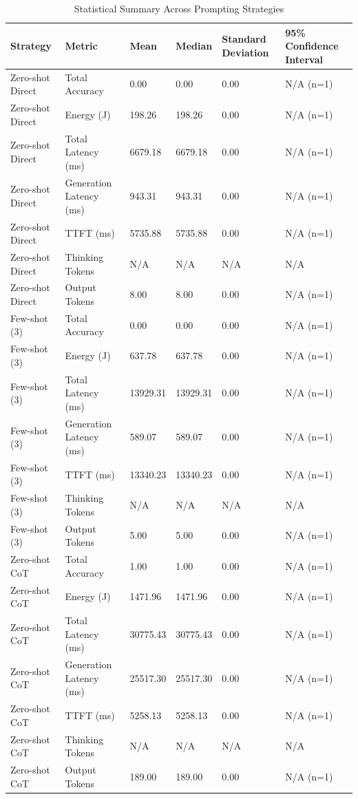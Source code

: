 \begin{table}
\caption{Statistical Summary Across Prompting Strategies}
\label{tab:statistical_summary}
\begin{tabular}{llllll}
\toprule
Strategy & Metric & Mean & Median & Standard Deviation & 95\% Confidence Interval \\
\midrule
Zero-shot Direct & Total Accuracy & 0.00 & 0.00 & 0.00 & N/A (n=1) \\
Zero-shot Direct & Energy (J) & 198.26 & 198.26 & 0.00 & N/A (n=1) \\
Zero-shot Direct & Total Latency (ms) & 6679.18 & 6679.18 & 0.00 & N/A (n=1) \\
Zero-shot Direct & Generation Latency (ms) & 943.31 & 943.31 & 0.00 & N/A (n=1) \\
Zero-shot Direct & TTFT (ms) & 5735.88 & 5735.88 & 0.00 & N/A (n=1) \\
Zero-shot Direct & Thinking Tokens & N/A & N/A & N/A & N/A \\
Zero-shot Direct & Output Tokens & 8.00 & 8.00 & 0.00 & N/A (n=1) \\
Few-shot (3) & Total Accuracy & 0.00 & 0.00 & 0.00 & N/A (n=1) \\
Few-shot (3) & Energy (J) & 637.78 & 637.78 & 0.00 & N/A (n=1) \\
Few-shot (3) & Total Latency (ms) & 13929.31 & 13929.31 & 0.00 & N/A (n=1) \\
Few-shot (3) & Generation Latency (ms) & 589.07 & 589.07 & 0.00 & N/A (n=1) \\
Few-shot (3) & TTFT (ms) & 13340.23 & 13340.23 & 0.00 & N/A (n=1) \\
Few-shot (3) & Thinking Tokens & N/A & N/A & N/A & N/A \\
Few-shot (3) & Output Tokens & 5.00 & 5.00 & 0.00 & N/A (n=1) \\
Zero-shot CoT & Total Accuracy & 1.00 & 1.00 & 0.00 & N/A (n=1) \\
Zero-shot CoT & Energy (J) & 1471.96 & 1471.96 & 0.00 & N/A (n=1) \\
Zero-shot CoT & Total Latency (ms) & 30775.43 & 30775.43 & 0.00 & N/A (n=1) \\
Zero-shot CoT & Generation Latency (ms) & 25517.30 & 25517.30 & 0.00 & N/A (n=1) \\
Zero-shot CoT & TTFT (ms) & 5258.13 & 5258.13 & 0.00 & N/A (n=1) \\
Zero-shot CoT & Thinking Tokens & N/A & N/A & N/A & N/A \\
Zero-shot CoT & Output Tokens & 189.00 & 189.00 & 0.00 & N/A (n=1) \\

\end{tabular}
\end{table}
